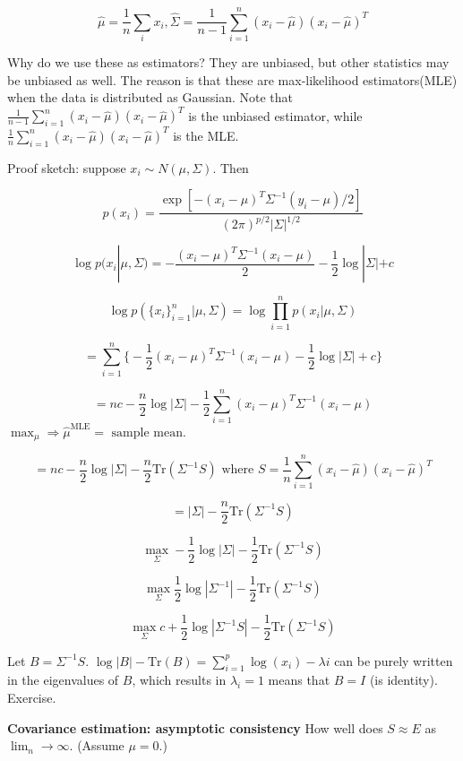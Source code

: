 \documentclass[12pt]{article}
\theoremstyle{plain}
\begin{document}
$$\hat{\mu} = \frac{1}{n} \sum_i x_i, \hat{\Sigma} = \frac{1}{n-1} \sum_{i=1}^n (x_i-\hat{\mu})(x_i-\hat{\mu})^T$$

Why do we use these as estimators? They are unbiased, but other statistics may be unbiased as well. The reason is that these are max-likelihood estimators(MLE) when the data is distributed as Gaussian. Note that $\frac{1}{n-1} \sum_{i=1}^n (x_i-\hat{\mu})(x_i-\hat{\mu})^T$ is the unbiased estimator, while $\frac{1}{n} \sum_{i=1}^n (x_i-\hat{\mu})(x_i-\hat{\mu})^T$ is the MLE. 

Proof sketch: suppose $x_i \sim N(\mu, \Sigma)$. Then

$$ p(x_i) = \frac{\exp[-(x_i - \mu)^T \Sigma^{-1} (y_i - \mu) / 2]}{(2\pi)^{p/2} |\Sigma|^{1/2}} $$

$$ \log p(x_i | \mu, \Sigma) = - \frac{(x_i - \mu)^T \Sigma^{-1} (x_i - \mu)}{2} - \frac{1}{2} \log |\Sigma| + c $$

$$ \log p( \{x_i\}_{i=1}^n | \mu, \Sigma) = \log \prod_{i=1}^n p(x_i | \mu, \Sigma) $$

$$ = \sum_{i=1}^n \Big\{ -\frac{1}{2} (x_i - \mu)^T \Sigma^{-1} (x_i - \mu) - \frac{1}{2} \log |\Sigma| + c \Big\} $$


$$ = nc - \frac{n}{2} \log |\Sigma | - \frac{1}{2} \sum_{i=1}^n (x_i - \mu)^T \Sigma^{-1} (x_i - \mu) $$
$\max_\mu \Rightarrow \hat{\mu}^\text{MLE} = \text{ sample mean}$.

$$ = nc - \frac{n}{2} \log |\Sigma | - \frac{n}{2} \text{Tr} (\Sigma^{-1} S) \text{ where } S = \frac{1}{n} \sum_{i=1}^n (x_i - \hat{\mu}) (x_i -\hat{ \mu})^T $$

$$ = |\Sigma| - \frac{n}{2} \text{Tr}(\Sigma^{-1} S) $$



$$ \max_{\Sigma} -\frac{1}{2} \log |\Sigma| - \frac{1}{2} \text{Tr} ( \Sigma^{-1} S) $$

$$ \max_{\Sigma} \frac{1}{2} \log |\Sigma^{-1}| - \frac{1}{2} \text{Tr} ( \Sigma^{-1} S) $$

$$ \max_{\Sigma} c + \frac{1}{2} \log |\Sigma^{-1}S| - \frac{1}{2} \text{Tr} ( \Sigma^{-1} S) $$

Let $B = \Sigma^{-1}S$. $\log|B| - \text{Tr}(B) = \sum_{i=1}^p \log(x_i) - \lambda i$ can be purely written in the eigenvalues of $B$, which results in $\lambda_i=1$ means that $B = I$ (is identity). Exercise.

\textbf{Covariance estimation: asymptotic consistency} How well does $S \approx E$ as $\lim_n \rightarrow \infty$. (Assume $\mu=0$.)
\end{document}
